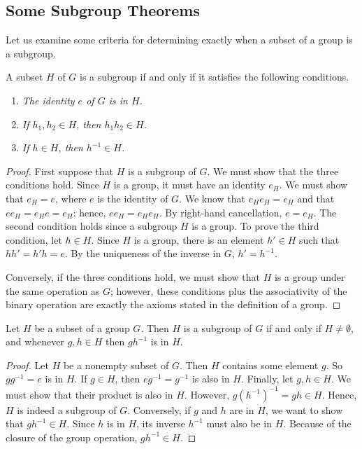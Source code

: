  
\subsection*{Some Subgroup Theorems}
 
 
Let us examine some criteria for determining exactly when a subset of
a group is a subgroup.
 
 
\begin{proposition}
A subset $H$ of $G$ is a subgroup if and only if it satisfies the
following conditions. 
\begin{enumerate}
 
\rm \item \it 
The identity $e$ of $G$ is in $H$. 
 
\rm \item \it 
If $h_1, h_2 \in H$, then $h_1h_2 \in H$. 
 
\rm \item \it 
If $h \in H$, then $h^{-1} \in H$.
 
\end{enumerate}
\end{proposition}
 
 
\begin{proof}
First suppose that $H$ is a subgroup of $G$.  We must show that the three conditions hold.  Since $H$ is a group, it must have an identity $e_H$.  We must show that $e_H = e$, where $e$ is the identity of $G$. We know that $e_H e_H = e_H$ and that $ee_H = e_H e = e_H$; hence, $ee_H = e_H e_H$.  By right-hand cancellation, $e =e_H$.  The second condition holds since a subgroup $H$ is a group.  To prove the third condition, let $h \in H$.  Since $H$ is a group, there is  an element $h' \in H$ such that $hh' = h'h = e$.  By the uniqueness  of the inverse in $G$, $h' = h^{-1}$.

Conversely, if the three conditions hold, we must show that $H$ is a group under the same operation as $G$; however, these conditions plus the associativity of the binary operation are exactly the axioms stated in the definition of a group.
\end{proof}

\begin{proposition}
Let $H$ be a subset of a group $G$.  Then $H$ is a subgroup of $G$ if and only if $H \neq \emptyset$, and whenever $g, h \in H$ then $gh^{-1}$ is in $H$. 
\end{proposition}
 
 
\begin{proof}
Let $H$ be a nonempty subset of $G$.  Then $H$ contains some element $g$.  So $gg^{-1} = e$ is in $H$.  If $g \in H$, then $eg^{-1} = g^{-1}$ is also in $H$. Finally, let $g, h \in H$. We must show that their product is also in $H$.  However, $g(h^{-1})^{-1} = gh \in H$.  Hence, $H$ is indeed a subgroup of $G$. Conversely, if $g$ and $h$ are in $H$, we want to show that $gh^{-1} \in H$.  Since $h$ is in $H$, its inverse $h^{-1}$ must also be in $H$.  Because of the closure of the group operation, $gh^{-1} \in H$. 
\end{proof}
 
